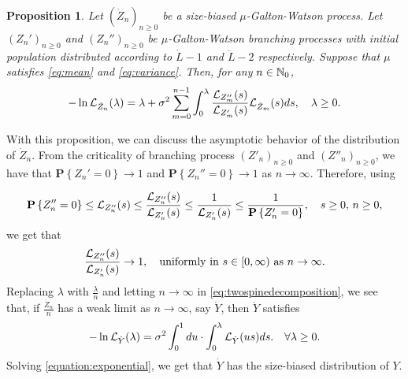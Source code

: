 \documentclass[12pt]{amsart}
\newtheorem{prop}[thm]{Proposition}
\theoremstyle{remark}
\numberwithin{equation}{section}
\newcommand{\prob}{\mathbf P}
\newcommand{\set}[1]{\left\{ #1 \right\}}
\newcommand{\uniformly}{\text{uniformly in }}
\newcommand{\while}{\text{ while }}
\begin{document}
\begin{prop}
\label{lem:twospinedecomposition}
Let $(\dot Z_n)_{n\ge 0}$ be a size-biased $\mu$-Galton-Watson process. 
Let $(Z_n')_{n\ge 0}$ and $(Z_n'')_{n\ge 0}$ be $\mu$-Galton-Watson branching processes with initial population distributed according to $\dot L-1$ and $\ddot L-2$ respectively. Suppose that $\mu$ satisfies \eqref{eq:mean} and \eqref{eq:variance}. Then, for any $n\in \mathbb N_0$,
\begin{equation}
\label{eq:twospinedecomposition}
		-\ln \mathcal L_{\dot Z_n}(\lambda)
	=
		\lambda+\sigma^2\sum_{m=0}^{n-1}\int_0^\lambda \frac{\mathcal L_{Z''_m}(s)}{\mathcal L_{Z'_m}(s)}\mathcal L_{\dot Z_m}(s)ds,
\quad \lambda \geq 0.
\end{equation}
\end{prop}
\par
With this proposition, we can discuss the asymptotic behavior of the distribution
of $\dot Z_n$.
From the criticality of branching process $(Z'_n)_{n\ge 0}$ and $(Z''_n)_{n\ge 0}$, we have that $\prob\set{Z_n'=0}\to 1$ and $\prob\set{Z_n''=0}\to 1$ 
as $n\to\infty$. Therefore, using

\begin{equation*}
		\prob\set{Z_n''=0}
	\leq
		\cL_{Z_n''}(s)
	\leq
		\frac{\cL_{Z_n''}(s)}{\cL_{Z_n'}(s)}
	\leq
		\frac{1}{\cL_{Z_n'}(s)}
	\leq
		\frac{1}{\prob \set{Z_n'=0}}
,\quad s\geq 0,\, n\ge 0,
\end{equation*}
    we get that
\begin{equation}
\label{eq:uniformly}
	    \frac{\cL_{Z_n''}(s)}{\cL_{Z_n'}(s)}
	\to
	    1,
\quad \uniformly s\in [0,\infty)\mbox{ as } n\to\infty.
\end{equation}
Replacing $\lambda$ with $\frac{\lambda}{n}$ and 
letting $n\to\infty$ in \eqref{eq:twospinedecomposition}, 
    we see that, if $\frac{\dot Z_n}{n}$ has a weak limit as $n\to\infty$, say $\dot Y$, then $\dot Y$ satisfies
\begin{equation}
\label{equation:exponential}
		-\ln \mathcal L_{\dot Y}(\lambda)
	=
		\sigma^2\int_0^1du\cdot\int_0^\lambda \mathcal L_{\dot Y}(us)ds
.\quad\forall\lambda \geq 0.
\end{equation}
Solving \eqref{equation:exponential}, 
we get that $\dot Y$ has the size-biased distribution of $Y$.
\end{document}
